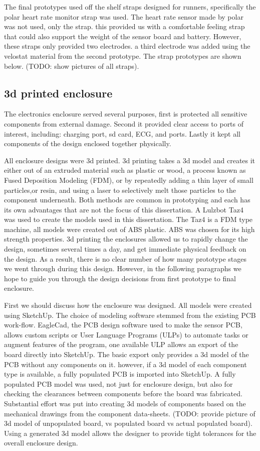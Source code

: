 The final prototypes used off the shelf straps designed for runners, specifically the polar heart rate monitor strap was used. The heart rate sensor made by polar was not used, only the strap. this provided us with a comfortable feeling strap that could also support the weight of the sensor board and battery. However, these straps only provided two electrodes. a third electrode was added using the velostat material from the second prototype. The strap prototypes are shown below. (TODO: show pictures of all straps).

\subsection {3d printed enclosure}
The electronics enclosure served several purposes, first is protected all sensitive components from external damage. Second it provided clear access to ports of interest, including: charging port, sd card, ECG, and  ports. Lastly it kept all components of the design enclosed together physically. 

All enclosure designs were 3d printed. 3d printing takes a 3d model and creates it either out of an extruded material such as plastic or wood, a process known as Fused Deposition Modeling (FDM), or by repeatedly adding a thin layer of small particles,or resin, and using a laser to selectively melt those particles to the component underneath. Both methods are common in prototyping and each has its own advantages that are not the focus of this dissertation. A Lulzbot Taz4 was used to create the models used in this dissertation. The Taz4 is a FDM type machine, all models were created out of ABS plastic. ABS was chosen for its high strength properties. 3d printing the enclosures allowed us to rapidly change the design, sometimes several times a day, and get immediate physical feedback on the design. As a result, there is no clear number of how many prototype stages we went through during this design. However, in the following paragraphs we hope to guide you through the design decisions from first prototype to final enclosure.

First we should discuss how the enclosure was designed. All models were created using SketchUp. The choice of modeling software stemmed from the existing PCB work-flow. EagleCad, the PCB design software used to make the sensor PCB, allows custom scripts or User Language Programs (ULPs) to automate tasks or augment features of the program, one available ULP allows an export of the board directly into SketchUp. The basic export only provides a 3d model of the PCB without any components on it. however, if a 3d model of each component type is available, a fully populated PCB is imported into SketchUp. A fully populated PCB model was used, not just for enclosure design, but also for checking the clearances between components before the board was fabricated. Substantial effort was put into creating 3d models of components based on the mechanical drawings from the component data-sheets. (TODO: provide picture of 3d model of unpopulated board, vs populated board vs actual populated board). Using a generated 3d model allows the designer to provide tight tolerances for the overall enclosure design. 

